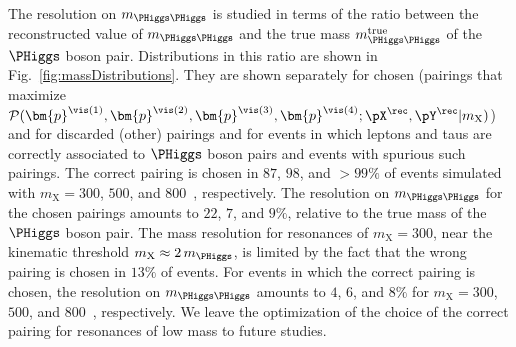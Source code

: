 The resolution on $m_{\PHiggs\PHiggs}$ is studied in terms of the ratio between the reconstructed value of $m_{\PHiggs\PHiggs}$ 
and the true mass $m_{\PHiggs\PHiggs}^{\textrm{true}}$ of the $\PHiggs$ boson pair.
Distributions in this ratio are shown in Fig.~\ref{fig:massDistributions}.
They are shown separately for chosen 
(pairings that maximize $\mathcal{P}(\bm{p}^{\vis(1)},\bm{p}^{\vis(2)},\bm{p}^{\vis(3)},\bm{p}^{\vis(4)};\pX^{\rec},\pY^{\rec}|m_{\textrm{X}})$) 
and for discarded (other) pairings and for
events in which leptons and taus are correctly associated to $\PHiggs$ boson pairs and events with spurious such pairings.
The correct pairing is chosen in $87$, $98$, and $>99\%$ of events simulated with $m_{\textrm{X}} = 300$, $500$, and $800$~\GeV, respectively.
The resolution on $m_{\PHiggs\PHiggs}$ for the chosen pairings amounts to $22$, $7$, and $9\%$,
relative to the true mass of the $\PHiggs$ boson pair.
The mass resolution for resonances of $m_{\textrm{X}} = 300$, near the kinematic threshold $m_{\textrm{X}} \approx 2 \, m_{\PHiggs}$,
is limited by the fact that the wrong pairing is chosen in $13\%$ of events.
For events in which the correct pairing is chosen, the resolution on $m_{\PHiggs\PHiggs}$ amounts to $4$, $6$, and $8\%$
for $m_{\textrm{X}} = 300$, $500$, and $800$~\GeV, respectively.
We leave the optimization of the choice of the correct pairing for resonances of low mass to future studies.


